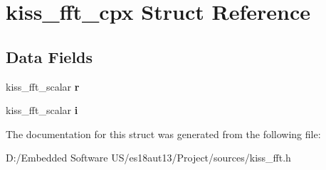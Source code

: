 \hypertarget{structkiss__fft__cpx}{}\section{kiss\+\_\+fft\+\_\+cpx Struct Reference}
\label{structkiss__fft__cpx}
\subsection*{Data Fields}
\begin{DoxyCompactItemize}
\item 
\hypertarget{structkiss__fft__cpx_a686b6187e3e885de316908319c71ea8f}{}kiss\+\_\+fft\+\_\+scalar {\bfseries r}\label{structkiss__fft__cpx_a686b6187e3e885de316908319c71ea8f}

\item 
\hypertarget{structkiss__fft__cpx_ac1e17add2ae6b815da29d7d67b03fa70}{}kiss\+\_\+fft\+\_\+scalar {\bfseries i}\label{structkiss__fft__cpx_ac1e17add2ae6b815da29d7d67b03fa70}

\end{DoxyCompactItemize}


The documentation for this struct was generated from the following file\+:\begin{DoxyCompactItemize}
\item 
D\+:/\+Embedded Software U\+S/es18aut13/\+Project/sources/kiss\+\_\+fft.\+h\end{DoxyCompactItemize}
